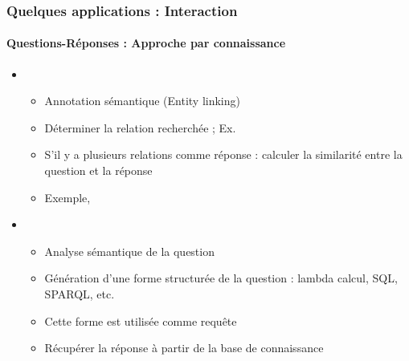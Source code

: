\documentclass[xcolor=table]{beamer}
\begin{document}
\begin{frame}
	\frametitle{Quelques applications : Interaction}
	\framesubtitle{Questions-Réponses : Approche par connaissance}
	
	\begin{itemize}
		\item {}
		\begin{itemize}
			\item Annotation sémantique (Entity linking)
			\item Déterminer la relation recherchée ; Ex. 
			\item S'il y a plusieurs relations comme réponse : calculer la similarité entre la question et la réponse
			\item Exemple, 
		\end{itemize}
		\item {}
		\begin{itemize}
			\item Analyse sémantique de la question
			\item Génération d'une forme structurée de la question : lambda calcul, SQL, SPARQL, etc.
			\item Cette forme est utilisée comme requête
			\item Récupérer la réponse à partir de la base de connaissance
		\end{itemize}
	\end{itemize}
	
\end{frame}
\end{document}
